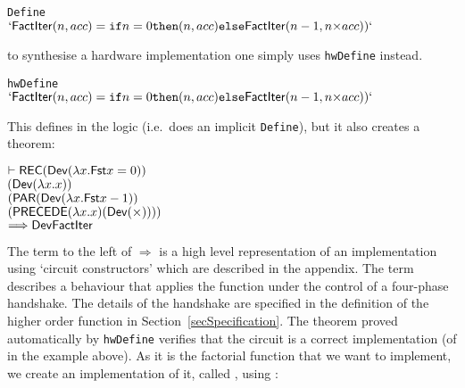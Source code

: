 \vspace*{-2mm}

{\baselineskip10pt\begin{alltt}
 Define
\(  `\DEF{FactIter}(n,acc) = \texttt{if} n=0 \texttt{then} (n,acc) \texttt{else} \DEF{FactIter}(n-1,n{\times}acc))`\)
\end{alltt}}

\vspace*{-2mm}

\noindent to synthesise a hardware implementation one simply uses
\texttt{hwDefine} instead.

\vspace*{-2mm}


{\baselineskip10pt\begin{alltt}
 hwDefine
\(  `\DEF{FactIter}(n,acc) = \texttt{if} n=0 \texttt{then} (n,acc) \texttt{else} \DEF{FactIter}(n-1,n{\times}acc))`\)
\end{alltt}}


\vspace*{-2mm}

\noindent This defines  in the logic (i.e.~does an
implicit \texttt{Define}), but it also creates a theorem:

\vspace*{-2mm}

{\baselineskip10pt\begin{alltt}
\( \vdash \DEF{REC} (\DEF{Dev} ({\lambda}x. \DEF{Fst} x = 0))         \) 
\(        (\DEF{Dev} ({\lambda}x. x))                                 \)
\(        (\DEF{PAR} (\DEF{Dev} ({\lambda}x. \DEF{Fst} x - 1))        \)
\(             (\DEF{PRECEDE} ({\lambda}x. x) (\DEF{Dev}({\times})))) \)
\(    \Longrightarrow \DEF{Dev} \DEF{FactIter}                        \)
\end{alltt}}

\vspace*{-2mm}

\noindent The term to the left of $\Longrightarrow$ is a high level
representation of an implementation using `circuit constructors' which
are described in the appendix.  The term  describes
a behaviour that applies the function  under the control
of a four-phase handshake. The details of the handshake are specified
in the definition of the higher order function  in
Section~\ref{secSpecification}. The theorem proved automatically by
\texttt{hwDefine} verifies that the circuit is a correct
implementation (of  in the example above). As it is the
factorial function  that we want to implement, we create an
implementation of it, called , using :

